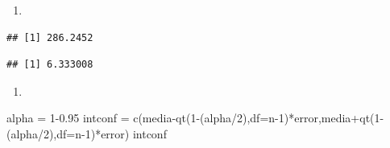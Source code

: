 \documentclass[
]{article}
\newenvironment{Shaded}{\begin{snugshade}}{\end{snugshade}}
\newcommand{\AttributeTok}[1]{\textcolor[rgb]{0.77,0.63,0.00}{#1}}
\newcommand{\DecValTok}[1]{\textcolor[rgb]{0.00,0.00,0.81}{#1}}
\newcommand{\FloatTok}[1]{\textcolor[rgb]{0.00,0.00,0.81}{#1}}
\newcommand{\FunctionTok}[1]{\textcolor[rgb]{0.00,0.00,0.00}{#1}}
\newcommand{\NormalTok}[1]{#1}
\newcommand{\OtherTok}[1]{\textcolor[rgb]{0.56,0.35,0.01}{#1}}
\newcommand{\SpecialCharTok}[1]{\textcolor[rgb]{0.00,0.00,0.00}{#1}}
\providecommand{\tightlist}{%
  \setlength{\itemsep}{0pt}\setlength{\parskip}{0pt}}
\begin{document}
\begin{enumerate}
\def\labelenumi{\alph{enumi})}
\tightlist
\item
\end{enumerate}

\begin{Shaded}
\end{Shaded}

\begin{verbatim}
## [1] 286.2452
\end{verbatim}

\begin{Shaded}
\end{Shaded}

\begin{verbatim}
## [1] 6.333008
\end{verbatim}

\begin{enumerate}
\def\labelenumi{\alph{enumi})}
\setcounter{enumi}{1}
\tightlist
\item
\end{enumerate}

\begin{Shaded}
\begin{Highlighting}[]
\NormalTok{alpha }\OtherTok{=} \DecValTok{1}\FloatTok{{-}0.95}
\NormalTok{intconf }\OtherTok{=} \FunctionTok{c}\NormalTok{(media}\SpecialCharTok{{-}}\FunctionTok{qt}\NormalTok{(}\DecValTok{1}\SpecialCharTok{{-}}\NormalTok{(alpha}\SpecialCharTok{/}\DecValTok{2}\NormalTok{),}\AttributeTok{df=}\NormalTok{n}\DecValTok{{-}1}\NormalTok{)}\SpecialCharTok{*}\NormalTok{error,media}\SpecialCharTok{+}\FunctionTok{qt}\NormalTok{(}\DecValTok{1}\SpecialCharTok{{-}}\NormalTok{(alpha}\SpecialCharTok{/}\DecValTok{2}\NormalTok{),}\AttributeTok{df=}\NormalTok{n}\DecValTok{{-}1}\NormalTok{)}\SpecialCharTok{*}\NormalTok{error)}
\NormalTok{intconf}
\end{Highlighting}
\end{Shaded}
\end{document}
